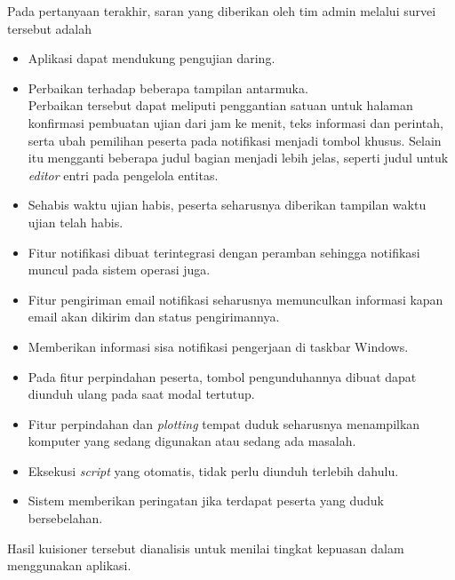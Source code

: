     Pada pertanyaan terakhir, saran yang diberikan oleh tim admin melalui survei tersebut adalah
    \begin{itemize}
        \item Aplikasi dapat mendukung pengujian daring.
        \item Perbaikan terhadap beberapa tampilan antarmuka. \\
            Perbaikan tersebut dapat meliputi penggantian satuan untuk halaman konfirmasi pembuatan ujian dari jam
            ke menit, teks informasi dan perintah, serta ubah pemilihan peserta pada notifikasi menjadi tombol khusus.
            Selain itu mengganti beberapa judul bagian menjadi lebih jelas, seperti judul untuk \textit{editor}
            entri pada pengelola entitas.
        \item Sehabis waktu ujian habis, peserta seharusnya diberikan tampilan waktu ujian telah habis.
        \item Fitur notifikasi dibuat terintegrasi dengan peramban sehingga notifikasi muncul pada 
            sistem operasi juga.
        \item Fitur pengiriman email notifikasi seharusnya memunculkan informasi kapan email akan
            dikirim dan status pengirimannya.
        \item Memberikan informasi sisa notifikasi pengerjaan di taskbar Windows.
        \item Pada fitur perpindahan peserta, tombol pengunduhannya dibuat dapat diunduh ulang pada
            saat modal tertutup.
        \item Fitur perpindahan dan \textit{plotting} tempat duduk seharusnya menampilkan komputer
            yang sedang digunakan atau sedang ada masalah.
        \item Eksekusi \textit{script} yang otomatis, tidak perlu diunduh terlebih dahulu.
        \item Sistem memberikan peringatan jika terdapat peserta yang duduk bersebelahan.
    \end{itemize}
    
    Hasil kuisioner tersebut dianalisis untuk menilai tingkat kepuasan dalam menggunakan aplikasi.

